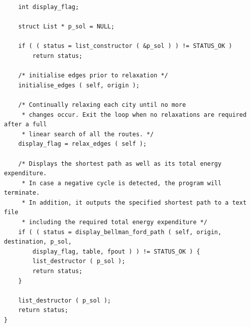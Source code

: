 \documentclass[11pt]{article}
\begin{document}
\begin{verbatim}
    int display_flag;

    struct List * p_sol = NULL;

    if ( ( status = list_constructor ( &p_sol ) ) != STATUS_OK )
        return status;

    /* initialise edges prior to relaxation */
    initialise_edges ( self, origin );

    /* Continually relaxing each city until no more
     * changes occur. Exit the loop when no relaxations are required after a full
     * linear search of all the routes. */
    display_flag = relax_edges ( self );

    /* Displays the shortest path as well as its total energy expenditure.
     * In case a negative cycle is detected, the program will terminate.
     * In addition, it outputs the specified shortest path to a text file
     * including the required total energy expenditure */
    if ( ( status = display_bellman_ford_path ( self, origin, destination, p_sol,
        display_flag, table, fpout ) ) != STATUS_OK ) {
        list_destructor ( p_sol );
        return status;
    }

    list_destructor ( p_sol );
    return status;
}
\end{verbatim}
\newpage
\end{document}
